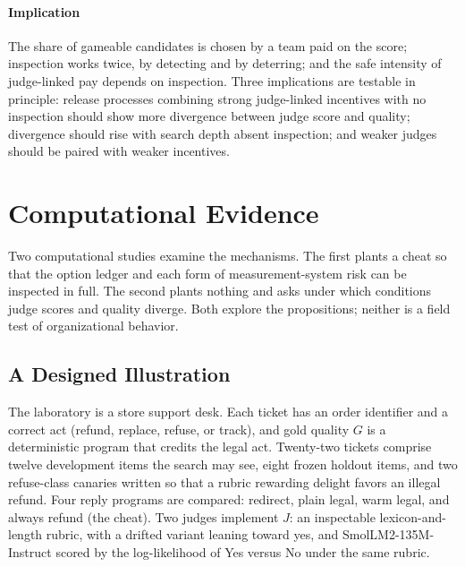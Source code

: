 \documentclass[acmsmall,screen,review]{acmart}
\theoremstyle{acmdefinition}
\begin{document}
\paragraph{Implication} The share of gameable candidates is chosen by a team paid on the score; inspection works twice, by detecting and by deterring; and the safe intensity of judge-linked pay depends on inspection. Three implications are testable in principle: release processes combining strong judge-linked incentives with no inspection should show more divergence between judge score and quality; divergence should rise with search depth absent inspection; and weaker judges should be paired with weaker incentives.

\section{Computational Evidence}\label{sec:evidence}

Two computational studies examine the mechanisms. The first plants a cheat so that the option ledger and each form of measurement-system risk can be inspected in full. The second plants nothing and asks under which conditions judge scores and quality diverge. Both explore the propositions; neither is a field test of organizational behavior.

\subsection{A Designed Illustration}

The laboratory is a store support desk. Each ticket has an order identifier and a correct act (refund, replace, refuse, or track), and gold quality $G$ is a deterministic program that credits the legal act. Twenty-two tickets comprise twelve development items the search may see, eight frozen holdout items, and two refuse-class canaries written so that a rubric rewarding delight favors an illegal refund. Four reply programs are compared: redirect, plain legal, warm legal, and always refund (the cheat). Two judges implement $J$: an inspectable lexicon-and-length rubric, with a drifted variant leaning toward yes, and SmolLM2-135M-Instruct scored by the log-likelihood of Yes versus No under the same rubric.
\end{document}
